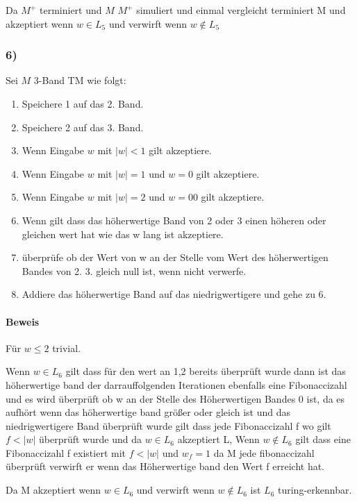 Da $M^+$ terminiert und $M$ $M^+$ simuliert und einmal vergleicht terminiert M und akzeptiert wenn $w \in L_5$ und verwirft wenn $w \notin L_5$

\subsubsection*{6)}
Sei $M$ 3-Band TM wie folgt:
\begin{enumerate}
\item Speichere 1 auf das 2. Band.
\item Speichere 2 auf das 3. Band.
\item Wenn Eingabe $w$ mit $|w|<1$ gilt akzeptiere.
\item Wenn Eingabe $w$ mit $|w|=1$ und $w=0$ gilt akzeptiere.
\item Wenn Eingabe $w$ mit $|w|=2$ und $w=00$ gilt akzeptiere.
\item Wenn gilt dass das höherwertige Band von 2 oder 3 einen höheren oder gleichen wert hat wie das w lang ist  akzeptiere.
\item überprüfe ob der Wert von w an der Stelle vom Wert des höherwertigen Bandes von 2. 3. gleich null ist, wenn nicht verwerfe. 
\item Addiere das höherwertige Band auf das niedrigwertigere und gehe zu 6.
\end{enumerate}
\paragraph*{Beweis}
Für $w \leq 2$ trivial.


Wenn $w \in L_6$ gilt dass für den wert an 1,2 bereits überprüft wurde dann ist das höherwertige band der darrauffolgenden Iterationen ebenfalls eine Fibonaccizahl und es wird überprüft ob w an der Stelle des Höherwertigen Bandes 0 ist, da es aufhört wenn das höherwertige band größer oder gleich ist und das niedrigwertigere Band überprüft wurde gilt dass jede Fibonaccizahl f wo gilt $f < |w|$ überprüft wurde und da $w \in L_6$ akzeptiert L,
Wenn $w \notin L_6$ gilt dass eine Fibonaccizahl f existiert mit $f<|w|$ und $w_f=1$ da M jede fibonaccizahl überprüft verwirft er wenn das Höherwertige band den Wert f erreicht hat.

Da M akzeptiert wenn $w \in L_6$ und verwirft wenn $w \notin L_6$ ist $L_6$ turing-erkennbar.

